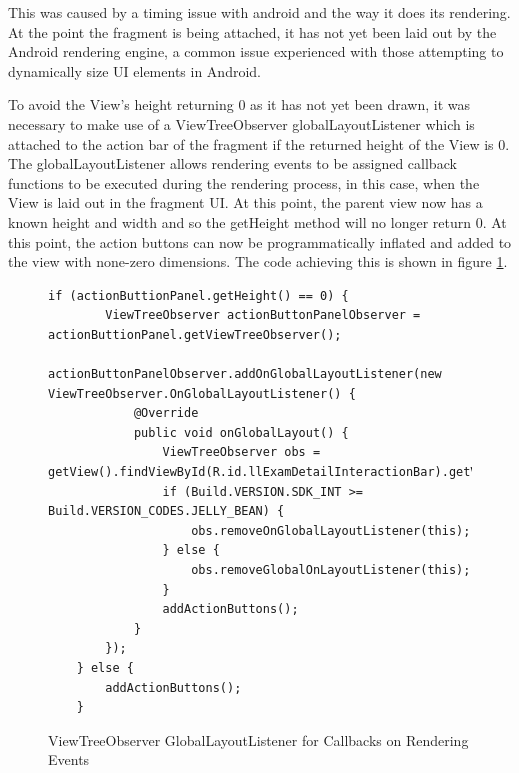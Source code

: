 This was caused by a timing issue with android and the way it does its rendering.  At the point the fragment is being attached, it has not yet been laid out by the Android rendering engine, a common issue experienced with those attempting to dynamically size UI elements in Android\cite{viewheight}.

To avoid the View's height returning 0 as it has not yet been drawn, it was necessary to make use of a ViewTreeObserver globalLayoutListener which is attached to the action bar of the fragment if the returned height of the View is 0.  The globalLayoutListener allows rendering events to be assigned callback functions to be executed during the rendering process, in this case, when the View is laid out in the fragment UI. At this point, the parent view now has a known height and width and so the getHeight method will no longer return 0.  At this point, the action buttons can now be programmatically inflated and added to the view with none-zero dimensions. The code achieving this is shown in figure \ref{fig:vto}.

\FloatBarrier

\begin{figure}[!htpb]
	\centering
	\lstset{language=Java}
	\begin{lstlisting}[tabsize=2,breaklines=true]
	if (actionButtionPanel.getHeight() == 0) {
		ViewTreeObserver actionButtonPanelObserver = actionButtionPanel.getViewTreeObserver();
		actionButtonPanelObserver.addOnGlobalLayoutListener(new ViewTreeObserver.OnGlobalLayoutListener() {
			@Override
			public void onGlobalLayout() {
				ViewTreeObserver obs = getView().findViewById(R.id.llExamDetailInteractionBar).getViewTreeObserver();
				if (Build.VERSION.SDK_INT >= Build.VERSION_CODES.JELLY_BEAN) {
					obs.removeOnGlobalLayoutListener(this);
				} else {
					obs.removeGlobalOnLayoutListener(this);
				}
				addActionButtons();
			}
		});
	} else {
		addActionButtons();
	}
	\end{lstlisting}
	\caption{ViewTreeObserver GlobalLayoutListener for Callbacks on Rendering Events}
	\label{fig:vto}
\end{figure}

\FloatBarrier